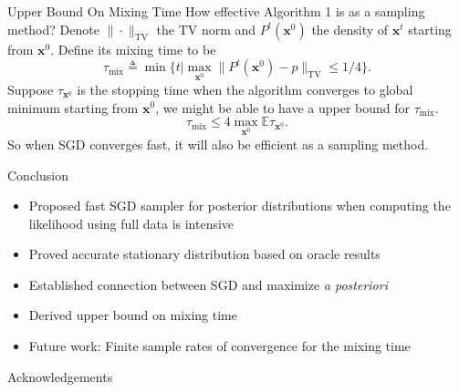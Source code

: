 \documentclass[final]{beamer}
\newlength{\onecolwid}
\newcommand{\bx}{\mathbf{x}}
\newcommand{\E}{\mathbb{E}}
\begin{document}
\begin{frame}[t]
\begin{columns}[t]
\begin{column}{\onecolwid}

\begin{block}{Upper Bound On Mixing Time}
How effective Algorithm 1 is as a sampling method? Denote $\|\cdot\|_{\mathrm{TV}}$ the TV norm and $P^t(\bx^0)$ the density of $\bx^t$ starting from $\bx^0$. Define its mixing time to be
\[
\tau_{\mathrm{mix}} \triangleq \min\{t|\max_{\bx^0}\|P^t(\bx^0) - p\|_{\mathrm{TV}}\leq 1/4\}.
\]
Suppose $\tau_{\bx^0}$ is the stopping time when the algorithm converges to global minimum starting from $\bx^0$, we might be able to have a upper bound for $\tau_{\mathrm{mix}}$.
\[
\tau_{\mathrm{mix}} \leq 4 \max_{\bx^0}\E \tau_{\bx^0}.
\]
So when SGD converges fast, it will also be efficient as a sampling method.
\end{block}


\begin{block}{Conclusion}

\begin{itemize}
\item Proposed fast SGD sampler for posterior distributions when computing the likelihood using full data is intensive
\item Proved accurate stationary distribution based on oracle results
\item Established connection between SGD and maximize \emph{a posteriori}
\item Derived upper bound on mixing time
\item Future work: Finite sample rates of convergence for the mixing time
\end{itemize}

\end{block}


\begin{block}{Acknowledgements}

\small{} \\


\end{block}
\end{column}
\end{columns}
\end{frame}
\end{document}
